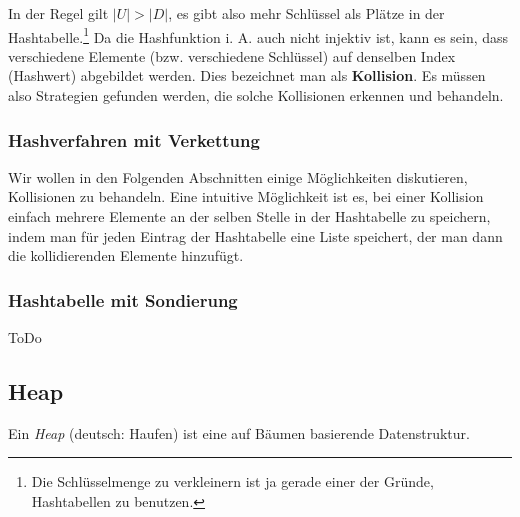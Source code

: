 \begin{anm}
  In der Regel gilt $|U| > |D|$, es gibt also mehr Schlüssel als
  Plätze in der Hashtabelle.\footnote{Die Schlüsselmenge zu
    verkleinern ist ja gerade einer der Gründe, Hashtabellen zu
    benutzen.} Da die Hashfunktion i. A. auch nicht injektiv ist, kann
  es sein, dass verschiedene Elemente (bzw. verschiedene Schlüssel)
  auf denselben Index (Hashwert) abgebildet werden. Dies bezeichnet
  man als \textbf{Kollision}. Es müssen also Strategien gefunden
  werden, die solche Kollisionen erkennen und behandeln.
\end{anm}

\subsubsection{Hashverfahren mit Verkettung}
Wir wollen in den Folgenden Abschnitten einige Möglichkeiten
diskutieren, Kollisionen zu behandeln. Eine intuitive Möglichkeit ist
es, bei einer Kollision einfach mehrere Elemente an der selben Stelle
in der Hashtabelle zu speichern, indem man für jeden Eintrag der
Hashtabelle eine Liste speichert, der man dann die kollidierenden
Elemente hinzufügt.

\subsubsection{Hashtabelle mit Sondierung}
\Large ToDo \normalsize

\subsection{Heap}
Ein \emph{Heap} (deutsch: Haufen) ist eine auf Bäumen basierende
Datenstruktur.


